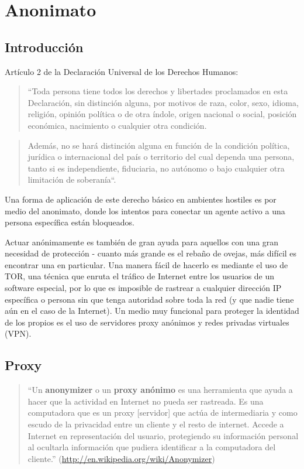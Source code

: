 \documentclass[10pt,a5paper,twoside,,]{book}
\begin{document}
\chapter{Anonimato}\label{anonimato}

\section{Introducción}\label{introducciuxf3n-1}

Artículo 2 de la Declaración Universal de los Derechos Humanos:

\begin{quote}
``Toda persona tiene todos los derechos y libertades proclamados en esta
Declaración, sin distinción alguna, por motivos de raza, color, sexo,
idioma, religión, opinión política o de otra índole, origen nacional o
social, posición económica, nacimiento o cualquier otra condición.
\end{quote}

\begin{quote}
Además, no se hará distinción alguna en función de la condición
política, jurídica o internacional del país o territorio del cual
dependa una persona, tanto si es independiente, fiduciaria, no autónomo
o bajo cualquier otra limitación de soberanía``.
\end{quote}

Una forma de aplicación de este derecho básico en ambientes hostiles es
por medio del anonimato, donde los intentos para conectar un agente
activo a una persona específica están bloqueados.

Actuar anónimamente es también de gran ayuda para aquellos con una gran
necesidad de protección - cuanto más grande es el rebaño de ovejas, más
difícil es encontrar una en particular. Una manera fácil de hacerlo es
mediante el uso de TOR, una técnica que enruta el tráfico de Internet
entre los usuarios de un software especial, por lo que es imposible de
rastrear a cualquier dirección IP específica o persona sin que tenga
autoridad sobre toda la red (y que nadie tiene aún en el caso de la
Internet). Un medio muy funcional para proteger la identidad de los
propios es el uso de servidores proxy anónimos y redes privadas
virtuales (VPN).

\section{Proxy}\label{proxy}

\begin{quote}
``Un \textbf{anonymizer} o un \textbf{proxy anónimo} es una herramienta
que ayuda a hacer que la actividad en Internet no pueda ser rastreada.
Es una computadora que es un proxy {[}servidor{]} que actúa de
intermediaria y como escudo de la privacidad entre un cliente y el resto
de internet. Accede a Internet en representación del usuario,
protegiendo su información personal al ocultarla información que pudiera
identificar a la computadora del cliente.''
(\url{http://en.wikipedia.org/wiki/Anonymizer})
\end{quote}
\end{document}
